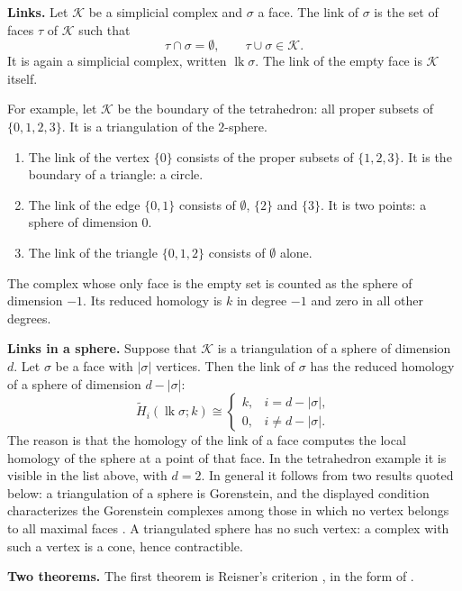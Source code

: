 \medskip\noindent
{\bf Links.}
Let $\mathcal{K}$ be a simplicial complex
and $\sigma$ a face. The link of $\sigma$
is the set of faces $\tau$ of
$\mathcal{K}$ such that
$$
\tau\cap\sigma=\emptyset,
\qquad
\tau\cup\sigma\in\mathcal{K}.
$$
It is again a simplicial complex,
written $\operatorname{lk}\sigma$. The
link of the empty face is $\mathcal{K}$
itself.

For example, let $\mathcal{K}$ be the
boundary of the tetrahedron: all proper
subsets of $\{0,1,2,3\}$. It is a
triangulation of the $2$-sphere.
\begin{enumerate}
\item The link of the vertex $\{0\}$
consists of the proper subsets of
$\{1,2,3\}$. It is the boundary of a
triangle: a circle.
\item The link of the edge $\{0,1\}$
consists of $\emptyset$, $\{2\}$ and
$\{3\}$. It is two points: a sphere of
dimension $0$.
\item The link of the triangle
$\{0,1,2\}$ consists of $\emptyset$
alone.
\end{enumerate}
The complex whose only face is the empty
set is counted as the sphere of
dimension $-1$. Its reduced homology is
$k$ in degree $-1$ and zero in all other
degrees.

\medskip\noindent
{\bf Links in a sphere.}
Suppose that $\mathcal{K}$ is a
triangulation of a sphere of dimension
$d$. Let $\sigma$ be a face with
$|\sigma|$ vertices. Then the link of
$\sigma$ has the reduced homology of a
sphere of dimension $d-|\sigma|$:
$$
\widetilde{H}_i
(\operatorname{lk}\sigma;k)\cong
\begin{cases}
k,& i=d-|\sigma|,\\
0,& i\neq d-|\sigma|.
\end{cases}
$$
The reason is that the homology of the link
of a face computes the local homology of the
sphere at a point of that face. In the
tetrahedron example it is visible in the list
above, with $d=2$. In general it follows from
two results quoted below: a triangulation of
a sphere is Gorenstein, and the displayed
condition characterizes the Gorenstein
complexes among those in which no vertex
belongs to all maximal faces \cite[Chapter
II, Theorem 5.1 and Corollary
5.2]{stanley-cca}. A triangulated sphere has
no such vertex: a complex with such a vertex
is a cone, hence contractible.

\medskip\noindent
{\bf Two theorems.}
The first theorem is Reisner's criterion
\cite{reisner-cm}, in the form of
\cite[Chapter II, Corollary
4.2]{stanley-cca}.

